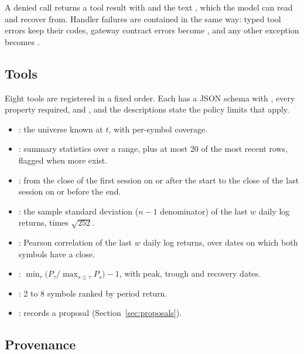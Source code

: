 A denied call returns a tool result with  and the text
, which the
model can read and recover from. Handler failures are contained in the same
way: typed tool errors keep their codes, gateway contract errors become
, and any other exception becomes
.

\subsection{Tools}
\label{sec:tools}

Eight tools are registered in a fixed order. Each has a JSON schema with
, every property required, and
, and the descriptions state the policy limits that apply.
\begin{itemize}
  \item {}: the universe known at $t$, with per-symbol coverage.
  \item {}: summary statistics over a range, plus at most
  20 of the most recent rows, flagged  when more exist.
  \item {}: from the close of the first session on or after
  the start to the close of the last session on or before the end.
  \item {}: the sample standard deviation
  ($n-1$ denominator) of the last $w$ daily log returns, times $\sqrt{252}$.
  \item {}: Pearson correlation of the last $w$ daily
  log returns, over dates on which both symbols have a close.
  \item {}: $\min_\tau \big(P_\tau / \max_{s \le \tau} P_s\big) - 1$,
  with peak, trough and recovery dates.
  \item {}: 2 to 8 symbols ranked by period return.
  \item {}: records a proposal (Section~\ref{sec:proposals}).
\end{itemize}

\subsection{Provenance}
\label{sec:provenance}


